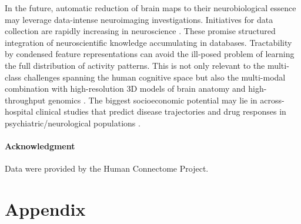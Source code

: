 \documentclass{article} %
\begin{document}
In the future, automatic reduction of brain maps to
their neurobiological essence
may leverage data-intense neuroimaging investigations.
Initiatives for data collection are rapidly increasing
in neuroscience \cite{poldrack2014data}.
These promise structured integration
of neuroscientific knowledge accumulating
in databases.
Tractability by
condensed feature representations can avoid the ill-posed problem of
learning the full distribution of activity patterns.
%
This is not only relevant to the 
multi-class challenges spanning the human cognitive space
\cite{schwartz2013mapping}
but also the
multi-modal combination with
high-resolution 3D models of brain anatomy \cite{amunts2013bigbrain}
and
high-throughput genomics \cite{need2010gwas}.
%
The biggest socioeconomic potential may
lie in across-hospital clinical studies that
predict disease trajectories and drug responses
in psychiatric/neurological populations
\cite{frackowiak2015future, gustav2011cost}.

\paragraph{Acknowledgment}
{\small
Data were provided by the Human Connectome Project.
}

\small



\newpage
\section{Appendix}
%
\end{document}
